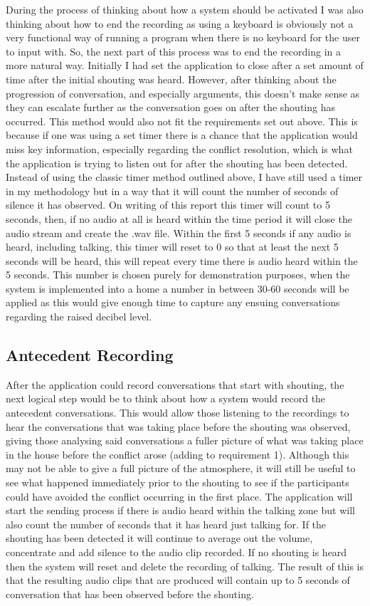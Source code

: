 \documentclass[a4paper,11pt]{report}
\begin{document}
During the process of thinking about how a system should be activated I was also thinking about how to end the recording as using a keyboard is obviously not a very functional way of running a program when there is no keyboard for the user to input with. So, the next part of this process was to end the recording in a more natural way. Initially I had set the application to close after a set amount of time after the initial shouting was heard. However, after thinking about the progression of conversation, and especially arguments, this doesn’t make sense as they can escalate further as the conversation goes on after the shouting has occurred. This method would also not fit the requirements set out above. This is because if one was using a set timer there is a chance that the application would miss key information, especially regarding the conflict resolution, which is what the application is trying to listen out for after the shouting has been detected. Instead of using the classic timer method outlined above, I have still used a timer in my methodology but in a way that it will count the number of seconds of silence it has observed. On writing of this report this timer will count to 5 seconds, then, if no audio at all is heard within the time period it will close the audio stream and create the .wav file. Within the first 5 seconds if any audio is heard, including talking, this timer will reset to 0 so that at least the next 5 seconds will be heard, this will repeat every time there is audio heard within the 5 seconds. This number is chosen purely for demonstration purposes, when the system is implemented into a home a number in between 30-60 seconds will be applied as this would give enough time to capture any ensuing conversations regarding the raised decibel level. 

\subsection{Antecedent Recording}
After the application could record conversations that start with shouting, the next logical step would be to think about how a system would record the antecedent conversations. This would allow those listening to the recordings to hear the conversations that was taking place before the shouting was observed, giving those analysing said conversations a fuller picture of what was taking place in the house before the conflict arose (adding to requirement 1). Although this may not be able to give a full picture of the atmosphere, it will still be useful to see what happened immediately prior to the shouting to see if the participants could have avoided the conflict occurring in the first place. The application will start the sending process if there is audio heard within the talking zone but will also count the number of seconds that it has heard just talking for. If the shouting has been detected it will continue to average out the volume, concentrate and add silence to the audio clip recorded. If no shouting is heard then the system will reset and delete the recording of talking. The result of this is that the resulting audio clips that are produced will contain up to 5 seconds of conversation that has been observed before the shouting. 
\end{document}
